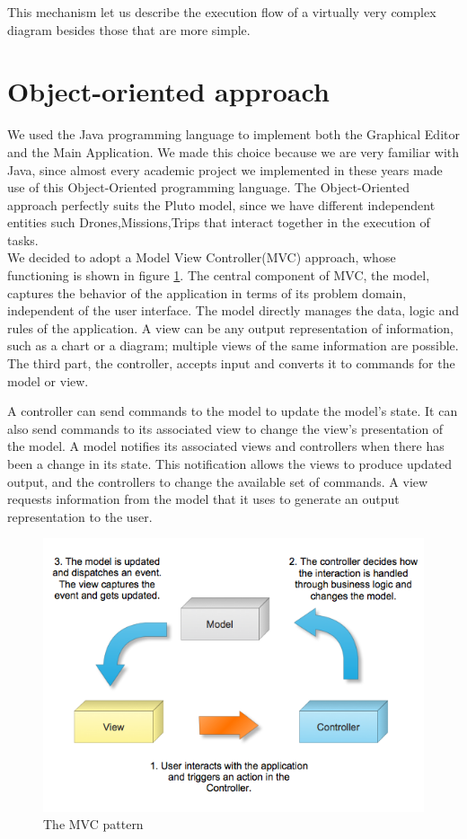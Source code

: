 This mechanism let us describe the execution flow of a virtually very complex diagram besides those that are more simple.


\section{Object-oriented approach}\label{oomodel}

We used the Java programming language to implement both the Graphical Editor and the Main Application.
We made this choice because we are very familiar with Java, since almost every academic project we implemented in these years made use of this Object-Oriented programming language.
The Object-Oriented approach perfectly suits the Pluto model, since we have different independent entities such Drones,Missions,Trips that interact together in the execution of tasks.
\\

We decided to adopt a Model View Controller(MVC) approach, whose functioning is shown in figure \ref{fig:mvc}.
The central component of MVC, the model, captures the behavior of the application in terms of its problem domain, independent of the user interface.
The model directly manages the data, logic and rules of the application.
A view can be any output representation of information, such as a chart or a diagram; multiple views of the same information are possible.
The third part, the controller, accepts input and converts it to commands for the model or view.

A controller can send commands to the model to update the model's state.
It can also send commands to its associated view to change the view's presentation of the model.
A model notifies its associated views and controllers when there has been a change in its state. This notification allows the views to produce updated output, and the controllers to change the available set of commands.
A view requests information from the model that it uses to generate an output representation to the user.

\begin{figure}[H]
\centering
\includegraphics[width=\linewidth]
{pictures/MVC.png}
  \caption{The MVC pattern}
  \label{fig:mvc}
\end{figure}

